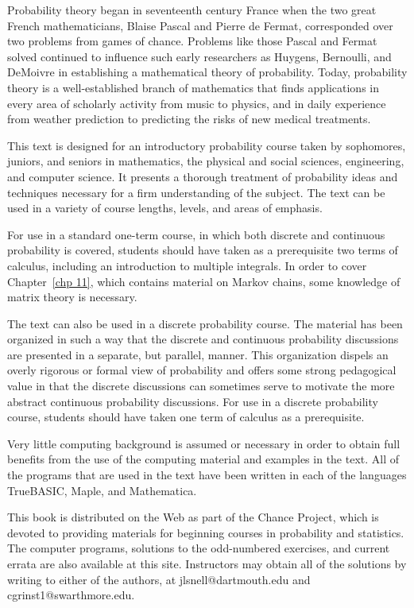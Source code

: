 Probability theory began in seventeenth century France when the two great
French 
mathematicians, Blaise Pascal and Pierre de Fermat, corresponded over two
problems from 
games of chance. Problems like those Pascal and Fermat solved continued to
influence such 
early researchers as Huygens, Bernoulli, and DeMoivre in establishing a
mathematical theory of 
probability. Today, probability theory is a well-established branch of
mathematics that finds 
applications in every area of scholarly activity from music to physics, and in
daily experience 
from weather prediction to predicting the risks of new medical treatments.

This text is designed for an introductory probability course taken by
sophomores, juniors, and
seniors in mathematics, the physical and social sciences, engineering, and
computer
science. It  presents a thorough treatment of probability ideas and techniques
necessary for a firm 
understanding of the subject. The text can be used in a variety of course
lengths, levels, and areas 
of emphasis.

For use in a standard one-term course, in which both discrete and continuous
probability is covered,
students should have taken as a prerequisite two terms of calculus, including
an introduction to
multiple integrals. In order to cover Chapter~\ref{chp 11}, which contains
material on Markov
chains,  some knowledge of matrix theory is necessary.

The text can also be used in a discrete probability course. The material has
been organized in 
such a way that the discrete and continuous probability discussions are
presented in a separate, 
but parallel, manner. This organization dispels an overly rigorous or formal
view of probability 
and offers some strong pedagogical value in that the discrete discussions can
sometimes serve to 
motivate the more abstract continuous probability discussions. For use in a
discrete probability 
course, students should have taken one term of calculus as a prerequisite.

Very little computing background is assumed or necessary in order to obtain
full benefits from the use of the computing material and examples in the text. 
All of the
programs that are used in the text have been written in each of
the languages TrueBASIC, Maple, and Mathematica.   

This book is distributed on the Web as part of the Chance Project,
which is devoted to providing materials for beginning
courses in probability
and statistics.  The computer programs, solutions to the odd-numbered
exercises, and current errata
are also available at this site.  Instructors may obtain all of the solutions
by writing to either
of the authors, at jlsnell@dartmouth.edu and cgrinst1@swarthmore.edu.


